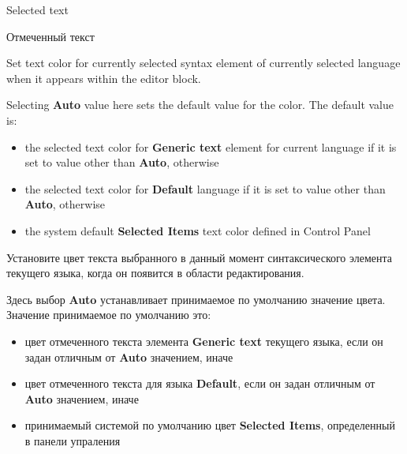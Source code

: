 \begin{popup}
\ifenglish
\caption{Selected text}
\else
\caption{Отмеченный текст}
\fi
{}

\ifenglish
Set text color for currently selected syntax element of currently selected
language when it appears within the editor block.

Selecting {\bf Auto} value here sets the default value for the color. The default
value is:

\begin{itemize}
\item the selected text color for {\bf Generic text} element for current language
 if it is set  to value other than {\bf Auto}, otherwise
\item the selected text color for {\bf Default} language
 if it is set  to value other than {\bf Auto}, otherwise
\item the system default {\bf Selected Items} text color defined
in Control Panel
\end{itemize}

\else
Установите цвет текста выбранного в данный момент синтаксического элемента
текущего языка, когда он появится в области редактирования.

Здесь выбор {\bf Auto} устанавливает принимаемое по умолчанию значение цвета.
Значение принимаемое по умолчанию это:

\begin{itemize}
\item
 цвет отмеченного текста элемента {\bf Generic text} текущего языка, если он задан
 отличным от {\bf Auto} значением, иначе
\item
 цвет отмеченного текста для языка {\bf Default}, если он задан отличным от {\bf Auto}
 значением, иначе
\item
  принимаемый системой по умолчанию цвет  {\bf Selected Items},
  определенный в панели упраления

\end{itemize}
\fi
\end{popup}

